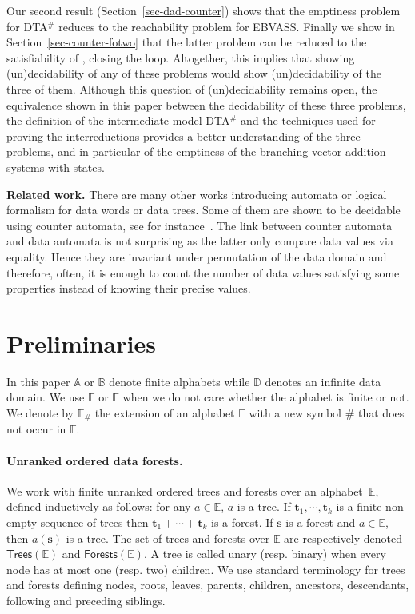 \documentclass{CSML}
\newcommand\ebvass{\textup{EBVASS}\xspace}
\newcommand\dad{\textup{DTA}$^\#$\xspace}
\newcommand\A{\ensuremath{\mathbb{A}}\xspace}
\newcommand\B{\mathbb{B}}
\newcommand\D{\mathbb{D}}
\newcommand\E{\mathbb{E}}
\newcommand\F{\mathbb{F}}
\newcommand\Trees{\mathsf{Trees}}
\newcommand\Forests{\mathsf{Forests}}
\newcommand\tree{\boldsymbol{t}}
\newcommand\stree{\boldsymbol{s}}
\begin{document}
Our second result (Section~\ref{sec-dad-counter}) shows that the emptiness
problem for \dad reduces to the reachability problem for \ebvass.  Finally we
show in Section~\ref{sec-counter-fotwo} that the latter problem can be reduced
to the satisfiability of \fotwo, closing the loop.  Altogether, this implies
that showing (un)decidability of any of these problems would show
(un)decidability of the three of them.
Although this question of (un)decidability remains open,
the equivalence shown in this paper between the decidability of these three problems,
the definition of the intermediate model \dad and the techniques used for proving
the interreductions provides
a better understanding of the three problems, 
and in particular of the emptiness of the branching vector addition systems with states.

{\bf Related work.}
There are many other works introducing automata or logical formalism for data
words or data trees. Some of them are shown to be decidable using counter automata,
see for instance~\cite{DL-tocl08,JL08}. The link between counter automata and
data automata is not surprising as the latter
only compare data values via equality. 
Hence they are invariant under permutation of the data domain and therefore, 
often, it is enough
to count the number of data values satisfying some properties instead of
knowing their precise values.



\section{Preliminaries}\label{sec:prelim}

In this paper $\A$ or $\B$ denote finite alphabets while $\D$ denotes an infinite
data domain. We use $\E$ or $\F$ when we do not care whether the alphabet is
finite or not. We denote by $\E_\#$ the extension of an alphabet $\E$ with a new symbol $\#$
that does not occur in $\E$.


\paragraph{Unranked ordered data forests.}
We work with finite unranked ordered trees and forests over an alphabet~$\E$,
defined inductively as follows: for any $a \in \E$, $a$ is a tree. If
$\tree_1,\cdots,\tree_k$ is a finite non-empty sequence of trees then 
$\tree_1 + \cdots + \tree_k$ is a forest. If $\stree$ is a forest and $a \in \E$, then
$a(\stree)$ is a tree. The set of trees and forests over $\E$ are respectively
denoted $\Trees(\E)$ and $\Forests(\E)$.  A tree is called unary
(resp. binary) when every node has at most one (resp. two) children.
We use standard terminology for trees and forests defining nodes, roots,
leaves, parents, children, ancestors, descendants, following 
and preceding siblings.
\end{document}
